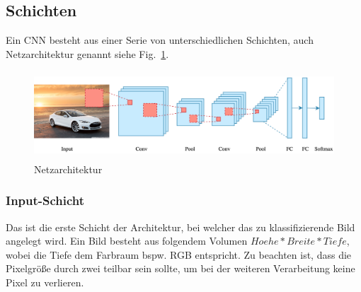 \subsection{Schichten}
Ein CNN besteht aus einer Serie von unterschiedlichen Schichten, auch Netzarchitektur genannt siehe Fig.~\ref{fig-architecture}.
\begin{figure}[htbp]
\centerline{\includegraphics[height=3.3cm]{img/architecture-cnn-car.png}}
\caption{Netzarchitektur \cite{Dertat.2017}}
\label{fig-architecture}
\end{figure}

\subsubsection{Input-Schicht}
Das ist die erste Schicht der Architektur, bei welcher das zu klassifizierende Bild angelegt wird. Ein Bild besteht aus folgendem Volumen $Hoehe*Breite*Tiefe$, wobei die Tiefe dem Farbraum bspw. RGB entspricht. Zu beachten ist, dass die Pixelgröße durch zwei teilbar sein sollte, um bei der weiteren Verarbeitung keine Pixel zu verlieren\cite{Doukkali.2017}.

